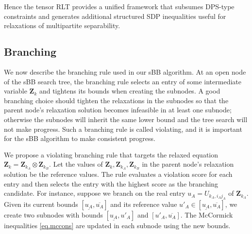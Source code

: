 \documentclass[smallextended]{svjour3}
\newcommand{\Z}{\mathbf{Z}}
\newcommand{\1}{\mathbf{1}}
\DeclareMathOperator{\mtens}{\otimes}
\begin{document}
Hence the tensor RLT provides a unified framework that subsumes DPS-type constraints and generates additional structured SDP inequalities useful for relaxations of multipartite separability.

\subsection{Branching}
We now describe the branching rule used in our sBB algorithm.
At an open node of the sBB search tree, the branching rule selects an entry of some intermediate variable $\Z_k$ and tightens its bounds when creating the subnodes. A good branching choice should tighten the relaxations in the subnodes so that the parent node's relaxation solution becomes infeasible in at least one subnode; otherwise the subnodes will inherit the same lower bound and the tree search will not make progress. Such a branching rule is called violating, and it is important for the sBB algorithm to make consistent progress.

We propose a violating branching rule that targets the relaxed equation $\Z_k = \Z_{k_A}\mtens\Z_{k_B}$. Let the values of $\Z_k,\Z_{k_A},\Z_{k_B}$ in the parent node's relaxation solution be the reference values. The rule evaluates a violation score for each entry and then selects the entry with the highest score as the branching candidate. For instance, suppose we branch on the real entry $u_A = U_{k_A,i_A j_A}$ of $\Z_{k_A}$. Given its current bounds $[\underline{u_A},\overline{u_A}]$ and its reference value $u'_A\in[\underline{u_A},\overline{u_A}]$, we create two subnodes with bounds $[\underline{u_A},u'_A]$ and $[u'_A,\overline{u_A}]$. The McCormick inequalities \eqref{eq.mccons} are updated in each subnode using the new bounds.
\end{document}
